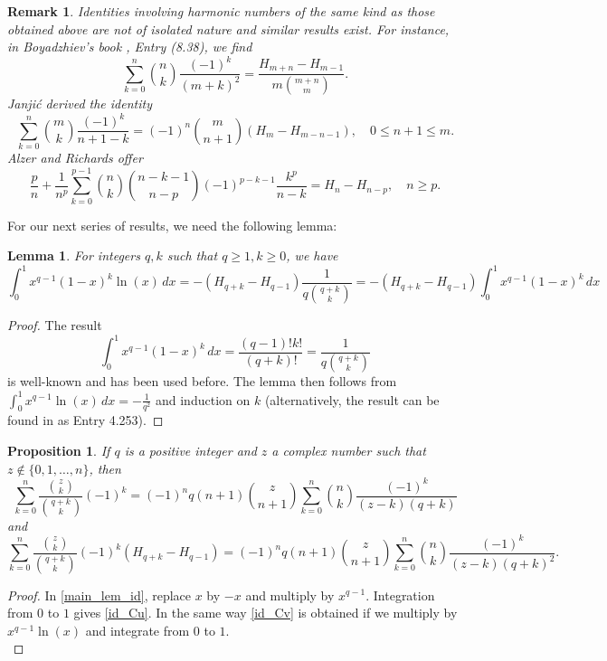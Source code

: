 \documentclass[11pt,reqno]{amsart}
\theoremstyle{plain}
\numberwithin{equation}{section}
\newtheorem{lemma}[thm]{Lemma}
\newtheorem{proposition}[thm]{Proposition}
\newtheorem{remark}[thm]{Remark}
\begin{document}
\begin{remark}
Identities involving harmonic numbers of the same kind as those obtained above are not of isolated nature and similar results exist. For instance, 
in Boyadzhiev's book \cite{Boyadzhiev}, Entry (8.38), we find
\begin{equation*}
\sum_{k=0}^n \binom{n}{k} \frac{(-1)^k}{(m+k)^2} = \frac{H_{m+n}-H_{m-1}}{m \binom{m+n}{m}}.
\end{equation*}
Janji\'{c} \cite[Proposition 8]{Janjic} derived the identity
\begin{equation*}
\sum_{k=0}^n \binom{m}{k} \frac{(-1)^k}{n+1-k} = (-1)^n \binom{m}{n+1} \left ( H_{m}-H_{m-n-1}\right ), \quad 0\leq n+1\leq m.
\end{equation*}
Alzer and Richards \cite[Remark 1]{Alzer} offer
\begin{equation*}
\frac{p}{n}+\frac{1}{n^p} \sum_{k=0}^{p-1} \binom{n}{k} \binom{n-k-1}{n-p} (-1)^{p-k-1} \frac{k^p}{n-k} = H_n - H_{n-p}, \quad n\geq p.
\end{equation*}
\end{remark}

For our next series of results, we need the following lemma:

\begin{lemma}\label{beta_int}
For integers $q,k$ such that $q\ge 1,k\ge 0$, we have
$$\int_0^1 x^{q-1} (1-x)^k\ln (x)\,dx = -(H_{q+k}-H_{q-1})\frac{1}{q\binom{q+k}{k}}=-(H_{q+k}-H_{q-1})\int_0^1 x^{q-1}(1-x)^k\,dx$$
\end{lemma}
\begin{proof}
The result
\[\int_0^1 x^{q-1}(1-x)^k\,dx=\frac{(q-1)!k!}{(q+k)!}=\frac{1}{q\binom{q+k}{k}}\]
is well-known and has been used before. The lemma then follows from $\int_0^1 x^{q-1}\ln(x)\,dx=-\frac{1}{q^2}$ and induction on $k$ (alternatively, the result can be found in \cite{GrRy07} as Entry 4.253).   
\end{proof}

\begin{proposition}
If $q$ is a positive integer and $z$ a complex number such that $z\notin\{0,1,\ldots,n\}$, then
\begin{equation}\label{id_Cu}
\sum_{k=0}^n \frac{\binom{z}{k}}{\binom{q+k}{k}}(-1)^k
= (-1)^n q(n+1) \binom{z}{n+1} \sum_{k=0}^n \binom{n}{k} \frac{(-1)^k}{(z-k)(q+k)}
\end{equation}
and
\begin{equation}\label{id_Cv}
\sum_{k=0}^n \frac{\binom{z}{k}}{\binom{q+k}{k}} (-1)^k\left( H_{q+k} - H_{q-1} \right) 
= (-1)^n q(n+1) \binom{z}{n+1} \sum_{k=0}^n \binom{n}{k} \frac{(-1)^k}{(z-k)(q+k)^2}.
\end{equation}
\end{proposition}
\begin{proof}
In \eqref{main_lem_id}, replace $x$ by $-x$ and multiply by $x^{q-1}$. Integration from $0$ to $1$ gives \eqref{id_Cu}. In the same way \eqref{id_Cv} is obtained if we multiply by $x^{q-1}\ln(x)$ and integrate from $0$ to $1$. \\
\end{proof}
\end{document}
